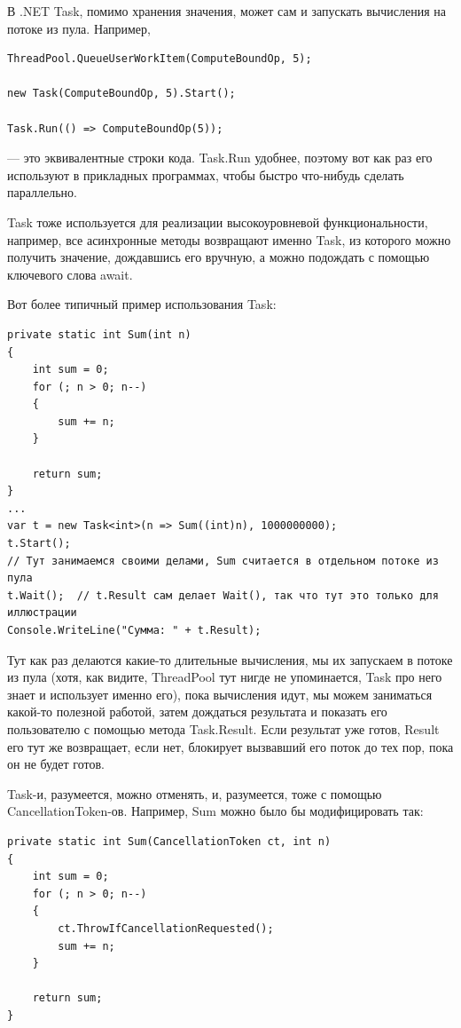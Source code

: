 \documentclass{../../text-style}
\begin{document}
В .NET Task, помимо хранения значения, может сам и запускать вычисления на потоке из пула. Например,

\begin{verbatim}
ThreadPool.QueueUserWorkItem(ComputeBoundOp, 5);

new Task(ComputeBoundOp, 5).Start();

Task.Run(() => ComputeBoundOp(5));
\end{verbatim}

--- это эквивалентные строки кода. Task.Run удобнее, поэтому вот как раз его используют в прикладных программах, чтобы быстро что-нибудь сделать параллельно.

Task тоже используется для реализации высокоуровневой функциональности, например, все асинхронные методы возвращают именно Task, из которого можно получить значение, дождавшись его вручную, а можно подождать с помощью ключевого слова await.

Вот более типичный пример использования Task:

\begin{verbatim}
private static int Sum(int n) 
{
    int sum = 0;
    for (; n > 0; n--)
    {
        sum += n;
    }

    return sum;
}
...
var t = new Task<int>(n => Sum((int)n), 1000000000);
t.Start();
// Тут занимаемся своими делами, Sum считается в отдельном потоке из пула
t.Wait();  // t.Result сам делает Wait(), так что тут это только для иллюстрации
Console.WriteLine("Сумма: " + t.Result);
\end{verbatim}

Тут как раз делаются какие-то длительные вычисления, мы их запускаем в потоке из пула (хотя, как видите, ThreadPool тут нигде не упоминается, Task про него знает и использует именно его), пока вычисления идут, мы можем заниматься какой-то полезной работой, затем дождаться результата и показать его пользователю с помощью метода Task.Result. Если результат уже готов, Result его тут же возвращает, если нет, блокирует вызвавший его поток до тех пор, пока он не будет готов.

Task-и, разумеется, можно отменять, и, разумеется, тоже с помощью CancellationToken-ов. Например, Sum можно было бы модифицировать так:

\begin{verbatim}
private static int Sum(CancellationToken ct, int n) 
{
    int sum = 0;
    for (; n > 0; n--) 
    {
        ct.ThrowIfCancellationRequested();
        sum += n;
    }
    
    return sum;
}
\end{verbatim}
\end{document}
